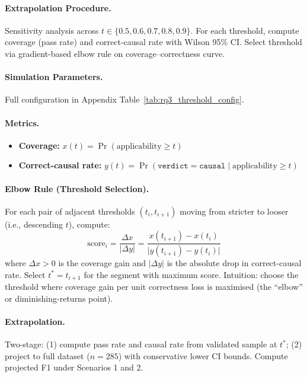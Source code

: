 \paragraph{Extrapolation Procedure.}
Sensitivity analysis across $t \in \{0.5, 0.6, 0.7, 0.8, 0.9\}$. For each threshold, compute coverage (pass rate) and correct-causal rate with Wilson 95\% CI. Select threshold via gradient-based elbow rule on coverage--correctness curve.

\paragraph{Simulation Parameters.}
Full configuration in Appendix Table~\ref{tab:rq3_threshold_config}.

\paragraph{Metrics.}
\begin{itemize}[noitemsep]
    \item \textbf{Coverage:} $x(t) = \Pr(\text{applicability} \geq t)$
    \item \textbf{Correct-causal rate:} $y(t) = \Pr(\texttt{verdict}=\texttt{causal} \mid \text{applicability} \geq t)$
\end{itemize}

\paragraph{Elbow Rule (Threshold Selection).}
For each pair of adjacent thresholds $(t_i, t_{i+1})$ moving from stricter to looser (i.e., descending $t$), compute:
\[
\text{score}_i = \frac{\Delta x}{\lvert \Delta y \rvert} = \frac{x(t_{i+1}) - x(t_i)}{\lvert y(t_{i+1}) - y(t_i) \rvert}
\]
where $\Delta x > 0$ is the coverage gain and $\lvert \Delta y \rvert$ is the absolute drop in correct-causal rate. Select $t^* = t_{i+1}$ for the segment with maximum score. Intuition: choose the threshold where coverage gain per unit correctness loss is maximised (the ``elbow'' or diminishing-returns point).

\paragraph{Extrapolation.}
Two-stage: (1) compute pass rate and causal rate from validated sample at $t^*$; (2) project to full dataset ($n=285$) with conservative lower CI bounds. Compute projected F1 under Scenarios 1 and 2.

